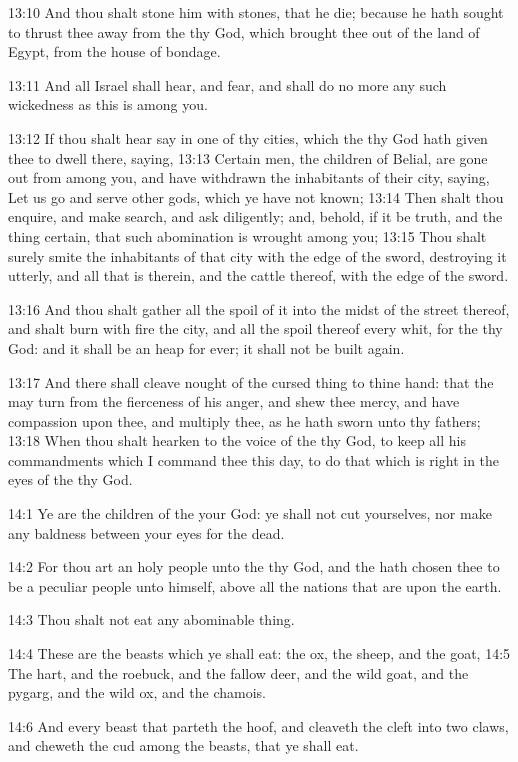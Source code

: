 13:10 And thou shalt stone him with stones, that he die; because he hath sought to thrust thee away from the \LORD thy God, which brought thee out of the land of Egypt, from the house of bondage.

13:11 And all Israel shall hear, and fear, and shall do no more any such wickedness as this is among you.

13:12 If thou shalt hear say in one of thy cities, which the \LORD thy God hath given thee to dwell there, saying, 13:13 Certain men, the children of Belial, are gone out from among you, and have withdrawn the inhabitants of their city, saying, Let us go and serve other gods, which ye have not known; 13:14 Then shalt thou enquire, and make search, and ask diligently; and, behold, if it be truth, and the thing certain, that such abomination is wrought among you; 13:15 Thou shalt surely smite the inhabitants of that city with the edge of the sword, destroying it utterly, and all that is therein, and the cattle thereof, with the edge of the sword.

13:16 And thou shalt gather all the spoil of it into the midst of the street thereof, and shalt burn with fire the city, and all the spoil thereof every whit, for the \LORD thy God: and it shall be an heap for ever; it shall not be built again.

13:17 And there shall cleave nought of the cursed thing to thine hand: that the \LORD may turn from the fierceness of his anger, and shew thee mercy, and have compassion upon thee, and multiply thee, as he hath sworn unto thy fathers; 13:18 When thou shalt hearken to the voice of the \LORD thy God, to keep all his commandments which I command thee this day, to do that which is right in the eyes of the \LORD thy God.

14:1 Ye are the children of the \LORD your God: ye shall not cut yourselves, nor make any baldness between your eyes for the dead.

14:2 For thou art an holy people unto the \LORD thy God, and the \LORD hath chosen thee to be a peculiar people unto himself, above all the nations that are upon the earth.

14:3 Thou shalt not eat any abominable thing.

14:4 These are the beasts which ye shall eat: the ox, the sheep, and the goat, 14:5 The hart, and the roebuck, and the fallow deer, and the wild goat, and the pygarg, and the wild ox, and the chamois.

14:6 And every beast that parteth the hoof, and cleaveth the cleft into two claws, and cheweth the cud among the beasts, that ye shall eat.

